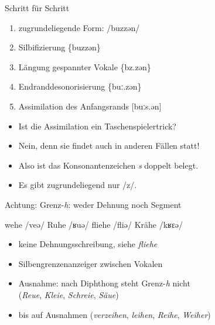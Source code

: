 \begin{frame}
  {Schritt für Schritt}
  \pause
  \begin{enumerate}[<+->]
    \item zugrundeliegende Form: \alert{/buzzən/}
    \item Silbifizierung \phopro \{buzzən\}
    \item Längung gespannter Vokale \phopro \{bz.zən\}
    \item Endranddesonorisierung \phopro \{buː.zən\}
    \item Assimilation des Anfangsrands \phopro \alert{[buːs.}\alert{ən]}
  \end{enumerate}
  \pause
  \begin{itemize}[<+->]
    \item Ist die Assimilation ein Taschenspielertrick?
    \item Nein, denn sie findet auch in anderen Fällen statt!
  \end{itemize}
  \pause
  \begin{exe}
    \ex\label{ex:dehnungsundschaerfungsschreibungen024}
    \begin{xlist}
      \pause
    \end{xlist}
  \end{exe}
  \pause
  \begin{itemize}[<+->]
    \item Also ist das Konsonantenzeichen \textit{s}  doppelt belegt.
    \item \alert{Es gibt zugrundeliegend nur /z/.}
  \end{itemize}
\end{frame}


\begin{frame}
  {Achtung: Grenz-\textit{h}: weder Dehnung noch Segment}
  \pause
  \begin{exe}
    \ex wehe /veə/
    \pause
    \ex Ruhe /ʁuə/
    \pause
    \ex fliehe /fliə/
    \pause
    \ex Krähe /kʁɛə/
  \end{exe}
  \pause
  \begin{itemize}[<+->]
    \item keine Dehnungsschreibung, siehe \textit{fliehe}
    \item \alert{Silbengrenzenanzeiger} zwischen Vokalen
      \Halbzeile
    \item Ausnahme: nach Diphthong steht Grenz-\textit{h} nicht\\
      (\textit{Reue}, \textit{Kleie}, \textit{Schreie}, \textit{Säue})
    \item bis auf Ausnahmen (\textit{verzeihen}, \textit{leihen}, \textit{Reihe}, \textit{Weiher})
  \end{itemize}
\end{frame}


